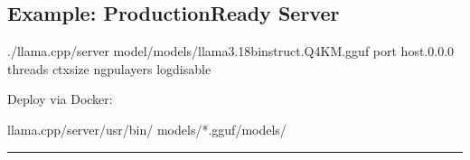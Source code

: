\documentclass[letterpaper,10pt,english]{sphinxmanual}
\begin{document}
\subsection{Example: Production\sphinxhyphen{}Ready Server}
\label{\detokenize{hybrid:example-production-ready-server}}
\begin{sphinxVerbatim}[commandchars=\\\{\}]
./llama.cpp/server
\PYGZhy{}\PYGZhy{}model/models/llama3.1\PYGZhy{}8b\PYGZhy{}instruct.Q4\PYGZus{}K\PYGZus{}M.gguf
\PYGZhy{}\PYGZhy{}port
\PYGZhy{}\PYGZhy{}host.0.0.0
\PYGZhy{}\PYGZhy{}threads
\PYGZhy{}\PYGZhy{}ctx\PYGZhy{}size
\PYGZhy{}\PYGZhy{}n\PYGZhy{}gpu\PYGZhy{}layers
\PYGZhy{}\PYGZhy{}log\PYGZhy{}disable
\end{sphinxVerbatim}

\sphinxAtStartPar
Deploy via Docker:

\begin{sphinxVerbatim}[commandchars=\\\{\}]
llama.cpp/server/usr/bin/
models/*.gguf/models/
\PYG{p}{[}\PYG{p}{]}
\end{sphinxVerbatim}


\bigskip\hrule\bigskip
\end{document}
